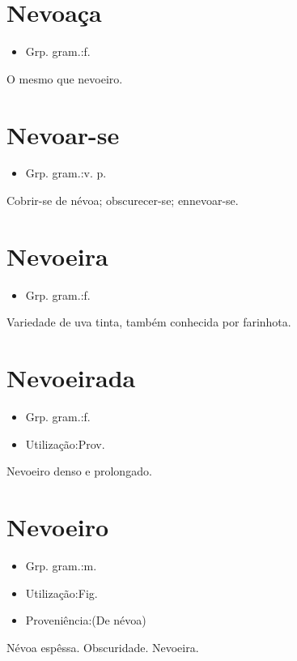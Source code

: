 \section{Nevoaça}
\begin{itemize}
\item {Grp. gram.:f.}
\end{itemize}
O mesmo que \textunderscore nevoeiro\textunderscore .
\section{Nevoar-se}
\begin{itemize}
\item {Grp. gram.:v. p.}
\end{itemize}
Cobrir-se de névoa; obscurecer-se; ennevoar-se.
\section{Nevoeira}
\begin{itemize}
\item {Grp. gram.:f.}
\end{itemize}
Variedade de uva tinta, também conhecida por \textunderscore farinhota\textunderscore .
\section{Nevoeirada}
\begin{itemize}
\item {Grp. gram.:f.}
\end{itemize}
\begin{itemize}
\item {Utilização:Prov.}
\end{itemize}
Nevoeiro denso e prolongado.
\section{Nevoeiro}
\begin{itemize}
\item {Grp. gram.:m.}
\end{itemize}
\begin{itemize}
\item {Utilização:Fig.}
\end{itemize}
\begin{itemize}
\item {Proveniência:(De \textunderscore névoa\textunderscore )}
\end{itemize}
Névoa espêssa.
Obscuridade.
Nevoeira.
